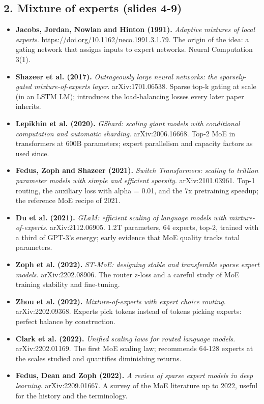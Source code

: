 \documentclass[11pt,letterpaper]{article}
\begin{document}
\subsection*{2. Mixture of experts (slides 4-9)}
\begin{itemize}[leftmargin=1.2em,itemsep=3pt]\sloppy
\item \textbf{Jacobs, Jordan, Nowlan and Hinton (1991).} \textit{Adaptive mixtures of local experts}. \url{https://doi.org/10.1162/neco.1991.3.1.79}. The origin of the idea: a gating network that assigns inputs to expert networks. Neural Computation 3(1).
\item \textbf{Shazeer et al. (2017).} \textit{Outrageously large neural networks: the sparsely-gated mixture-of-experts layer}. arXiv:1701.06538. Sparse top-k gating at scale (in an LSTM LM); introduces the load-balancing losses every later paper inherits.
\item \textbf{Lepikhin et al. (2020).} \textit{GShard: scaling giant models with conditional computation and automatic sharding}. arXiv:2006.16668. Top-2 MoE in transformers at 600B parameters; expert parallelism and capacity factors as used since.
\item \textbf{Fedus, Zoph and Shazeer (2021).} \textit{Switch Transformers: scaling to trillion parameter models with simple and efficient sparsity}. arXiv:2101.03961. Top-1 routing, the auxiliary loss with alpha = 0.01, and the 7x pretraining speedup; the reference MoE recipe of 2021.
\item \textbf{Du et al. (2021).} \textit{GLaM: efficient scaling of language models with mixture-of-experts}. arXiv:2112.06905. 1.2T parameters, 64 experts, top-2, trained with a third of GPT-3's energy; early evidence that MoE quality tracks total parameters.
\item \textbf{Zoph et al. (2022).} \textit{ST-MoE: designing stable and transferable sparse expert models}. arXiv:2202.08906. The router z-loss and a careful study of MoE training stability and fine-tuning.
\item \textbf{Zhou et al. (2022).} \textit{Mixture-of-experts with expert choice routing}. arXiv:2202.09368. Experts pick tokens instead of tokens picking experts: perfect balance by construction.
\item \textbf{Clark et al. (2022).} \textit{Unified scaling laws for routed language models}. arXiv:2202.01169. The first MoE scaling law; recommends 64-128 experts at the scales studied and quantifies diminishing returns.
\item \textbf{Fedus, Dean and Zoph (2022).} \textit{A review of sparse expert models in deep learning}. arXiv:2209.01667. A survey of the MoE literature up to 2022, useful for the history and the terminology.

\end{itemize}
\end{document}
